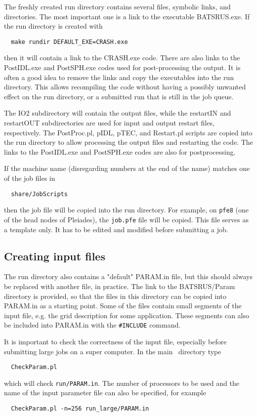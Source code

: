 The freshly created run directory contains several files, symbolic links, 
and directories. The most important one is a link to the executable BATSRUS.exe. 
If the run directory is created with
\begin{verbatim}
  make rundir DEFAULT_EXE=CRASH.exe
\end{verbatim}
then it will contain a link to the CRASH.exe code. There are also links to
the PostIDL.exe and PostSPH.exe codes used for post-processing the output.
It is often a good idea to remove the links and copy the executables into
the run directory. This allows recompiling the code without having a possibly
unwanted effect on the run directory, or a submitted run that is still in 
the job queue.

The IO2 subdirectory will contain the output files, while the restartIN and restartOUT
subdirectories are used for input and output restart files, respectively.
The PostProc.pl, pIDL, pTEC, and Restart.pl scripts are copied into the 
run directory to allow processing the output files and restarting the code.
The links to the PostIDL.exe and PostSPH.exe codes are also for postprocessing.

If the machine name (disregarding numbers at the end of the name) matches 
one of the job files in 
\begin{verbatim}
  share/JobScripts
\end{verbatim}
then the job file will be copied
into the run directory. For example, on {\tt pfe8} (one of the head nodes 
of Pleiades), the {\tt job.pfe} file will be copied. This file serves as a
template only. It has to be edited and modified before submitting a job.

\subsection{Creating input files}

The run directory also contains a "default" PARAM.in file, but this should always
be replaced with another file, in practice.
The link to the BATSRUS/Param directory is provided, so that the files in
this directory can be copied into PARAM.in as a starting point. 
Some of the files contain small segments of the input file, e.g. the grid
description for some application. These segments can also be included
into PARAM.in with the {\tt \#INCLUDE} command.

It is important to check the correctness of the input file, especially before submitting
large jobs on a super computer. In the main \BATSRUS\ directory type
\begin{verbatim}
  CheckParam.pl
\end{verbatim}
which will check {\tt run/PARAM.in}. The number of processors to be used and
the name of the input parameter file can also be specified, for example
\begin{verbatim}
  CheckParam.pl -n=256 run_large/PARAM.in
\end{verbatim}

